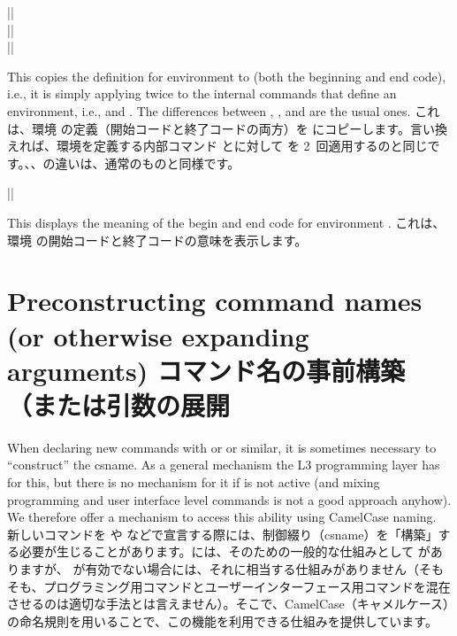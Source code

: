 \documentclass{ltxguide}
\newcommand\jpnewline{\vspace{3pt}\newline}
\begin{document}
\begin{decl}
  |\NewEnvironmentCopy|         \\
  |\RenewEnvironmentCopy|       \\
  |\DeclareEnvironmentCopy|    
\end{decl}

This copies the definition for environment  to
 (both the beginning and end code), i.e., it is simply
applying  twice to the internal commands that
define an environment, i.e., \cs{} and .
The differences between , , and
 are the usual ones.
\jpnewline
これは、環境 の定義（開始コードと終了コードの両方）を にコピーします。言い換えれば、環境を定義する内部コマンド \cs{}とに対して を 2~回適用するのと同じです。、、の違いは、通常のものと同様です。

\begin{decl}
  |\ShowEnvironment|       
\end{decl}
This displays the meaning of the begin and end code for environment .
\jpnewline
これは、環境 の開始コードと終了コードの意味を表示します。


\section[Preconstructing command names \\ (or otherwise expanding arguments)
コマンド名の事前構築（または引数の展開]
        {Preconstructing command names (or otherwise expanding arguments)
        コマンド名の事前構築（または引数の展開}
\label{sec:preconstructing-csnames}

When declaring new commands with  or
 or similar, it is sometimes necessary to
``construct'' the csname. As a general mechanism the L3 programming
layer has  for this, but there is no mechanism for
it if  is not active (and mixing programming and user
interface level commands is not a good approach anyhow). We therefore
offer a mechanism to access this ability using CamelCase naming.
\jpnewline
新しいコマンドを や  などで宣言する際には、制御綴り（csname）を「構築」する必要が生じることがあります。には、そのための一般的な仕組みとして  がありますが、 が有効でない場合には、それに相当する仕組みがありません（そもそも、プログラミング用コマンドとユーザーインターフェース用コマンドを混在させるのは適切な手法とは言えません）。そこで、CamelCase（キャメルケース）の命名規則を用いることで、この機能を利用できる仕組みを提供しています。
\end{document}
